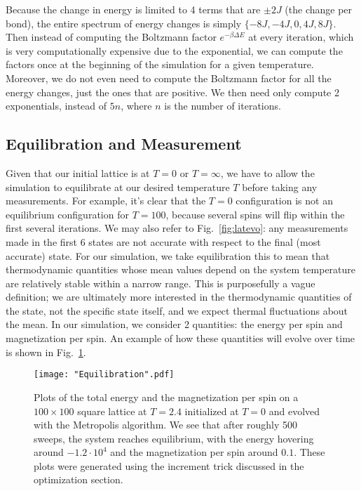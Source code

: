 \documentclass[twocolumn,aps,prl]{revtex4-1} %
\begin{document}
Because the change in energy is limited to 4 terms that are $\pm 2J$ (the change per bond), the entire spectrum of energy changes is simply $\{-8J, -4J, 0, 4J, 8J\}$. Then instead of computing the Boltzmann factor $e^{-\beta\Delta E}$ at every iteration, which is very computationally expensive due to the exponential, we can compute the factors once at the beginning of the simulation for a given temperature. Moreover, we do not even need to compute the Boltzmann factor for all the energy changes, just the ones that are positive. We then need only compute 2 exponentials, instead of $5n$, where $n$ is the number of iterations.

\subsection{Equilibration and Measurement}
Given that our initial lattice is at $T = 0$ or $T = \infty$, we have to allow the simulation to equilibrate at our desired temperature $T$ before taking any measurements. For example, it's clear that the $T = 0$ configuration is not an equilibrium configuration for $T = 100$, because several spins will flip within the first several iterations. We may also refer to Fig.~\ref{fig:latevo}: any measurements made in the first 6 states are not accurate with respect to the final (most accurate) state. For our simulation, we take equilibration this to mean that thermodynamic quantities whose mean values depend on the system temperature are relatively stable within a narrow range. This is purposefully a vague definition; we are ultimately more interested in the thermodynamic quantities of the state, not the specific state itself, and we expect thermal fluctuations about the mean. In our simulation, we consider 2 quantities: the energy per spin and magnetization per spin. An example of how these quantities will evolve over time is shown in Fig.~\ref{fig:equil}. 
\begin{figure}
	\texttt{[image: "Equilibration".pdf]}
	\caption{\label{fig:equil}Plots of the total energy and the magnetization per spin on a $100 \times 100$ square lattice at $T = 2.4$ initialized at $T = 0$ and evolved with the Metropolis algorithm. We see that after roughly 500 sweeps, the system reaches equilibrium, with the energy hovering around $-1.2\cdot 10^{4}$ and the magnetization per spin around $0.1$. These plots were generated using the increment trick discussed in the optimization section.}
\end{figure}
\end{document}
